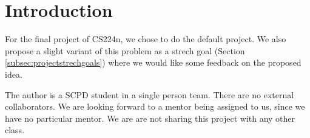 \section{Introduction}
\label{sec:introduction}

For the final project of CS224n, we chose to do the default project. We also propose a slight variant of this problem as a strech goal (Section \ref{subsec:projectstrechgoals}) where we would like some feedback on the proposed idea.

The author is a SCPD student in a single person team. There are no external collaborators. We are looking forward to a mentor being assigned to us, since we have no particular mentor. We are are not sharing this project with any other class.

